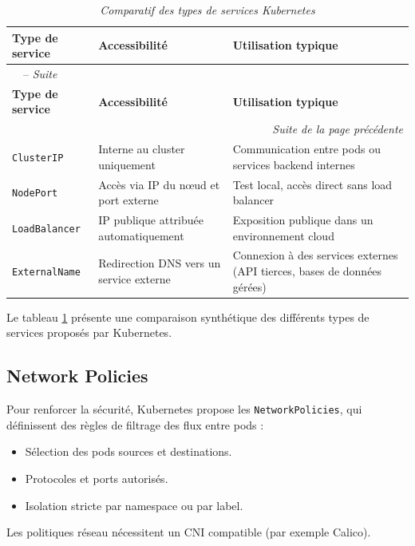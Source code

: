 \begin{longtable}{|p{4cm}|p{5cm}|p{6cm}|}
	\caption{\it{Comparatif des types de services Kubernetes}}
	\label{tab:services_k8s}                                                                                                                      \\ \hline
	\textbf{Type de service} & \textbf{Accessibilité}                  & \textbf{Utilisation typique}                                             \\ \hline
	\endfirsthead
	\multicolumn{3}{l}{\tablename\ \thetable\ -- \textit{Suite}}                                                                                  \\ \hline
	\textbf{Type de service} & \textbf{Accessibilité}                  & \textbf{Utilisation typique}                                             \\ \hline
	\endhead
	\hline \multicolumn{3}{r}{\textit{Suite de la page précédente}}                                                                               \\ \hline
	\endfoot
	\hline
	\endlastfoot

	\texttt{ClusterIP}       & Interne au cluster uniquement           & Communication entre pods ou services backend internes                    \\ \hline
	\texttt{NodePort}        & Accès via IP du nœud et port externe    & Test local, accès direct sans load balancer                              \\ \hline
	\texttt{LoadBalancer}    & IP publique attribuée automatiquement   & Exposition publique dans un environnement cloud                          \\ \hline
	\texttt{ExternalName}    & Redirection DNS vers un service externe & Connexion à des services externes (API tierces, bases de données gérées) \\ \hline

\end{longtable}
Le tableau \ref{tab:services_k8s} présente une comparaison synthétique des différents types de services proposés par Kubernetes.

\subsection{Network Policies}

Pour renforcer la sécurité, Kubernetes propose les \texttt{NetworkPolicies}, qui définissent des règles de filtrage des flux entre pods :
\begin{itemize}
	\item Sélection des pods sources et destinations.
	\item Protocoles et ports autorisés.
	\item Isolation stricte par namespace ou par label.
\end{itemize}
Les politiques réseau nécessitent un CNI compatible (par exemple Calico).

